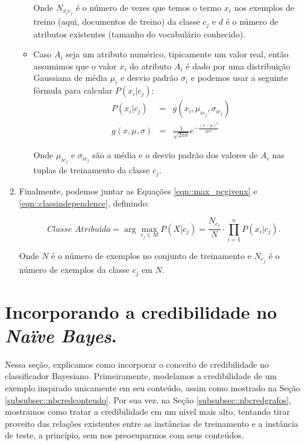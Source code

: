 \begin{enumerate}
\begin{itemize}
        Onde $N_{x_{i}c_{j}}$ é o número de vezes que temos o termo $x_i$ nos exemplos de treino (aqui, documentos de treino) da classe $c_j$ e $d$ é o número de atributos existentes (tamanho do vocabulário conhecido).

        \item Caso $A_i$ seja um atributo numérico, tipicamente um valor real, então assumimos que o valor $x_i$ do atributo $A_i$ é dado por uma distribuição Gaussiana de média $\mu_i$ e desvio padrão $\sigma_i$ e podemos usar a seguinte fórmula para calcular $P(x_i|c_j)$:
    \begin{eqnarray}\label{eqn::nbnumerico}
        P(x_i|c_j) & = & g(x_i, \mu_{ic_j}, \sigma_{ic_j})  \\
        g(x, \mu, \sigma) & = & \frac {1} { \sqrt{2\pi\sigma} } e^{ -\frac{(x-\mu)^2}{2\sigma^2}  } 
    \end{eqnarray}
        
        Onde $\mu_{ic_j}$ e $\sigma_{ic_j}$ são a média e o desvio padrão dos valores de $A_i$ nas tuplas de treinamento da classe $c_j$. 

    \end{itemize}

    \item Finalmente, podemos juntar as Equações \ref{eqn::max_pcgivenx} e \ref{eqn::classindependence}, definindo:

    \begin{equation}\label{eqn::nbfinal}
    \textit{Classe Atribuída} = \arg\max_{c_j \in M}P(X|c_j) = \frac{N_{c_j}}{N} \cdot {\prod^{n}_{i=1}{P(x_i|c_j) }}.
    \end{equation}

    Onde $N$ é o número de exemplos no conjunto de treinamento e $N_{c_j}$ é o número de exemplos da classe $c_j$ em $N$.


\end{enumerate}


\section{Incorporando a credibilidade no \textit{Naïve Bayes}.}
\label{subsubsec::nb_cred}

Nessa seção, explicamos como incorporar o conceito de credibilidade no classificador Bayesiano. Primeiramente, modelamos a credibilidade de um exemplo inspirado unicamente em seu conteúdo, assim como mostrado na Seção \ref{subsubsec::nbcredconteudo}. Por sua vez, na Seção \ref{subsubsec::nbcredgrafos}, mostramos como tratar a credibilidade em um nível mais alto, tentando tirar proveito das relações existentes entre as instâncias de treinamento e a instância de teste, a princípio, sem nos preocuparmos com seus conteúdos.

